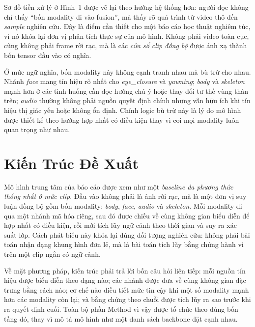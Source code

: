 \documentclass[conference,a4paper]{IEEEtran}
\begin{document}
Sơ đồ tiền xử lý ở Hình~1 được vẽ lại theo hướng hệ thống hơn: người đọc không chỉ thấy ``bốn modality đi vào fusion'', mà thấy rõ quá trình từ video thô đến \textit{sample} nghiên cứu. Đây là điểm cần thiết cho một báo cáo học thuật nghiêm túc, vì nó khóa lại đơn vị phân tích thực sự của mô hình. Không phải video toàn cục, cũng không phải frame rời rạc, mà là các \textit{cửa sổ clip đồng bộ} được ánh xạ thành bốn tensor đầu vào có nghĩa.

Ở mức ngữ nghĩa, bốn modality này không cạnh tranh nhau mà bù trừ cho nhau. Nhánh \textit{face} mang tín hiệu rõ nhất cho \textit{eye\_closure} và \textit{yawning}; \textit{body} và \textit{skeleton} mạnh hơn ở các tình huống cần đọc hướng chú ý hoặc thay đổi tư thế vùng thân trên; \textit{audio} thường không phải nguồn quyết định chính nhưng vẫn hữu ích khi tín hiệu thị giác yếu hoặc không ổn định. Chính logic bù trừ này là lý do mô hình được thiết kế theo hướng hợp nhất có điều kiện thay vì coi mọi modality luôn quan trọng như nhau.

\section[Kien Truc De Xuat]{Kiến Trúc Đề Xuất}
Mô hình trung tâm của báo cáo được xem như một \textit{baseline đa phương thức thống nhất ở mức clip}. Đầu vào không phải là ảnh rời rạc, mà là một đơn vị suy luận đồng bộ gồm bốn modality: \textit{body}, \textit{face}, \textit{audio} và \textit{skeleton}. Mỗi modality đi qua một nhánh mã hóa riêng, sau đó được chiếu về cùng không gian biểu diễn để hợp nhất có điều kiện, rồi mới tích lũy ngữ cảnh theo thời gian và suy ra xác suất lớp. Cách phát biểu này khóa lại đúng đối tượng nghiên cứu: không phải bài toán nhận dạng khung hình đơn lẻ, mà là bài toán tích lũy bằng chứng hành vi trên một clip ngắn có ngữ cảnh.

Về mặt phương pháp, kiến trúc phải trả lời bốn câu hỏi liên tiếp: mỗi nguồn tín hiệu được biểu diễn theo dạng nào; các nhánh được đưa về cùng không gian đặc trưng bằng cách nào; cơ chế nào điều tiết mức tin cậy khi một số modality mạnh hơn các modality còn lại; và bằng chứng theo chuỗi được tích lũy ra sao trước khi ra quyết định cuối. Toàn bộ phần Method vì vậy được tổ chức theo đúng bốn tầng đó, thay vì mô tả mô hình như một danh sách backbone đặt cạnh nhau.
\end{document}
